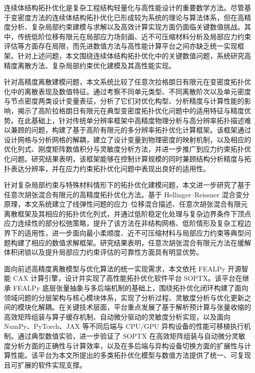 \begin{cnabstract}

连续体结构拓扑优化是复杂工程结构轻量化与高性能设计的重要数学方法。尽管基于变密度方法的连续体结构拓扑优化已形成较为系统的理论与算法体系，但在高精度分析、复杂局部约束建模与求解以及高效计算实现方面仍面临关键数值挑战。其中，传统低阶位移有限元在局部应力场刻画、近不可压缩材料分析及局部应力约束评估等方面存在局限，而先进数值方法与高性能计算平台之间亦缺乏统一实现框架。针对上述问题，本文围绕连续体结构拓扑优化中的关键数值问题，系统研究高精度离散方法、复杂局部约束优化建模及其高性能实现。

针对高精度离散建模问题，本文系统比较了任意次拉格朗日有限元在变密度拓扑优化中的离散表现及数值特征。通过考察不同单元类型、不同离散阶次以及单元密度与节点密度两类设计变量表征，分析了它们对优化构型、分析精度与计算性能的影响，揭示了高阶拉格朗日有限元在典型变密度拓扑优化问题中的适用特征与精度优势。在此基础上，针对传统单分辨率框架中高精度物理分析与高分辨率拓扑描述难以兼顾的问题，构建了基于高阶有限元的多分辨率拓扑优化计算框架。该框架通过设计网格与分析网格的解耦，建立了设计变量到物理密度的映射机制，以及相应的优化列式、刚度矩阵数值积分与灵敏度分析方法，并进一步推广到应力约束拓扑优化问题。研究结果表明，该框架能够在控制计算规模的同时兼顾结构分析精度与拓扑表达分辨率，并在应力约束拓扑优化问题中表现出良好的适用性。

针对复杂局部约束与特殊材料情形下的拓扑优化建模问题，本文进一步研究了基于任意次胡张混合有限元的高精度拓扑优化方法。基于 Hellinger–Reissner 混合变分原理，本文系统建立了线弹性问题的应力--位移混合描述、任意次胡张混合有限元离散框架及其相应的拓扑优化列式，并通过低阶稳定化处理与复杂边界条件下顶点应力连续性的部分松弛策略，提升了该方法在非结构网格、低阶情形及复杂工程边界下的适用性，进一步面向最小柔顺度、近不可压缩材料与局部应力约束等典型问题构建了相应的数值求解框架。研究结果表明，任意次胡张混合有限元方法在缓解体积闭锁以及提升局部应力约束评估的可靠性方面具有明显优势。

面向前述高精度离散模型与优化算法的统一实现需求，本文依托 FEALPy 开源智能 CAX 计算引擎，设计并实现了高性能拓扑优化软件平台 SOPTX。该平台在继承 FEALPy 底层张量抽象与多后端机制的基础上，围绕拓扑优化闭环构建了面向领域问题的分层架构与核心模块体系，实现了分析过程、灵敏度分析与优化更新之间的模块化解耦。在关键技术层面，平台重点发展了基于解析预计算与张量收缩的高效矩阵组装与算子缓存机制、自动微分驱动的灵敏度分析实现，以及面向 NumPy、PyTorch、JAX 等不同后端与 CPU/GPU 异构设备的性能可移植执行机制。通过典型数值实验，进一步验证了 SOPTX 在高效矩阵组装与自动微分灵敏度分析方面的正确性与计算效率，以及在多后端与异构设备切换方面的扩展性与计算性能。该平台为本文所提出的多类拓扑优化模型与数值方法提供了统一、可复现且可扩展的软件实现支撑。


\end{cnabstract}

